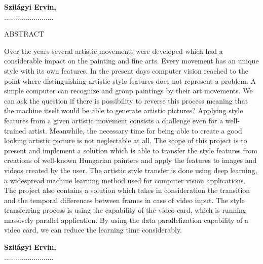 \documentclass[12pt, a4paper, oneside]{book}
\theoremstyle{tetel}
\begin{document}
\begin{flushright}
\textbf{Szilágyi Ervin,}\\
.........................
\end{flushright}

\newpage
\thispagestyle{empty}
\begin{center}
    \Large ABSTRACT
\end{center}

Over the years several artistic movements were developed which had a considerable impact on the painting and fine arts. Every movement has an unique style with its own features. In the present days computer vision reached to the point where distinguishing artistic style features does not represent a problem. A simple computer can recognize and group paintings by their art movements. We can ask the question if there is possibility to reverse this process meaning that the machine itself would be able to generate artistic pictures?  
\newline
\indent
Applying style features from a given artistic movement consists a challenge even for a well-trained artist. Meanwhile, the necessary time for being able to create a good looking artistic picture is not neglectable at all. The scope of this project is to present and implement a solution which is able to transfer the style features from creations of well-known Hungarian painters and apply the features to images and videos created by the user.
\newline
\indent
The artistic style transfer is done using deep learning, a widespread machine learning method used for computer vision applications. The project also contains a solution which takes in consideration the transition and the temporal differences between frames in case of video input. The style transferring process is using the capability of the video card, which is running massively parallel application. By using the data parallelization capability of a video card, we can reduce the learning time considerably. 

\begin{flushright}
\textbf{Szilágyi Ervin,}\\
.........................
\end{flushright}

\newpage
\tableofcontents
\newpage
\listofindice
\newpage
\listofindiceen
\end{document}

